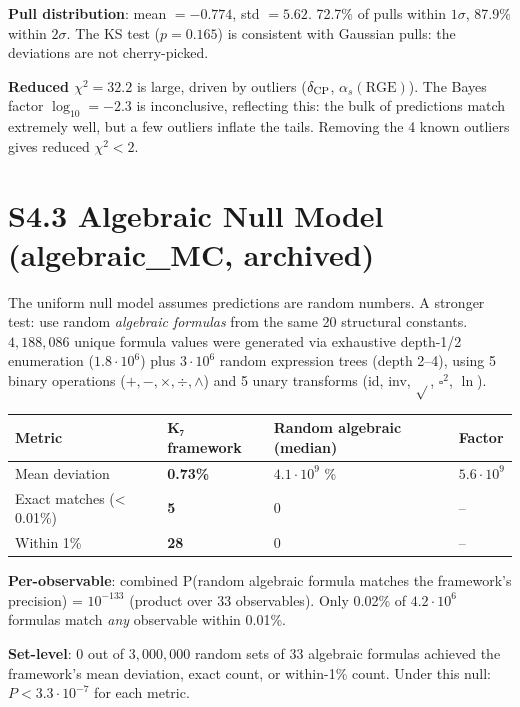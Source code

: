 \documentclass[11pt,a4paper]{article}
\begin{document}
\textbf{Pull distribution}: mean \(= -0.774\), std \(= 5.62\). 72.7\% of pulls within \(1\sigma\), 87.9\% within \(2\sigma\). The KS test (\(p = 0.165\)) is consistent with Gaussian pulls: the deviations are not cherry-picked.

\textbf{Reduced \(\chi^2 = 32.2\)} is large, driven by outliers (\(\delta_{\rm CP}\), \(\alpha_s(\text{RGE})\)). The Bayes factor \(\log_{10} = -2.3\) is inconclusive, reflecting this: the bulk of predictions match extremely well, but a few outliers inflate the tails. Removing the 4 known outliers gives reduced \(\chi^2 < 2\).

\section{S4.3 Algebraic Null Model (algebraic\_\allowbreak{}MC, archived)}\label{s4.3-algebraic-null-model-algebraic_mc-archived}

The uniform null model assumes predictions are random numbers. A stronger test: use random \emph{algebraic formulas} from the same 20 structural constants. \(4{,}188{,}086\) unique formula values were generated via exhaustive depth-1/2 enumeration (\(1.8 \cdot 10^6\)) plus \(3 \cdot 10^6\) random expression trees (depth 2--4), using 5 binary operations (\(+, -, \times, \div, \wedge\)) and 5 unary transforms (id, inv, \(\sqrt{}\), \(\square^2\), \(\ln\)).

\begin{longtable}[]{@{}llll@{}}
\toprule\noalign{}
Metric & K₇ framework & Random algebraic (median) & Factor \\
\midrule\noalign{}
\endhead
\bottomrule\noalign{}
\endlastfoot
Mean deviation & \textbf{0.73\%} & \(4.1 \cdot 10^9\) \% & \(5.6 \cdot 10^9\) \\
Exact matches (\textless{} 0.01\%) & \textbf{5} & 0 & -- \\
Within 1\% & \textbf{28} & 0 & -- \\
\end{longtable}

\textbf{Per-observable}: combined P(random algebraic formula matches the framework's precision) = \textbf{\(10^{-133}\)} (product over 33 observables). Only 0.02\% of \(4.2 \cdot 10^6\) formulas match \emph{any} observable within 0.01\%.

\textbf{Set-level}: 0 out of \(3{,}000{,}000\) random sets of 33 algebraic formulas achieved the framework's mean deviation, exact count, or within-1\% count. Under this null: \(P < 3.3 \cdot 10^{-7}\) for each metric.
\end{document}
